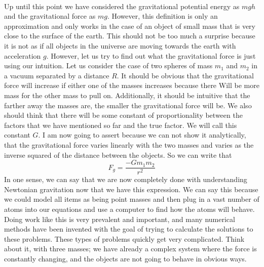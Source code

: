 \
\
\
\
\newline
Up until this point we have considered the gravitational potential energy as $mgh$ and the gravitational force as $mg$. However, this definition is only an approximation and only works in the case of an object of small mass that is very close to the surface of the earth. This should not be too much a surprise because it is not as if all objects in the universe are moving towards the earth with acceleration $g$. However, let us try to find out what the gravitational force is just using our intuition. Let us consider the case of two spheres of mass $m_1$ and $m_2$ in a vacuum separated by a distance $R$. It should be obvious that the gravitational force will increase if either one of the masses increases because there Will be more mass for the other mass to pull on. Additionally, it should be intuitive that the farther away the masses are, the smaller the gravitational force will be. We also should think that there will be some constant of proportionality between the factors that we have mentioned so far and the true factor. We will call this constant $G$. I am now going to assert because we can not show it analytically, that the gravitational force varies linearly with the two masses and varies as the inverse squared of the distance between the objects. So we can write that \begin{equation}F_g=\frac{-G m_1 m_2}{r^2}\end{equation} In one sense, we can say that we are now completely done with understanding Newtonian gravitation now that we have this expression. We can say this because we could model all items as being point masses and then plug in a vast number of atoms into our equations and use a computer to find how the atoms will behave. Doing work like this is very prevalent and important, and many numerical methods have been invented with the goal of trying to calculate the solutions to these problems. 
These types of problems quickly get very complicated. Think about it, with three masses; we have already a complex system where the force is constantly changing, and the objects are not going to behave in obvious ways.
\newline
